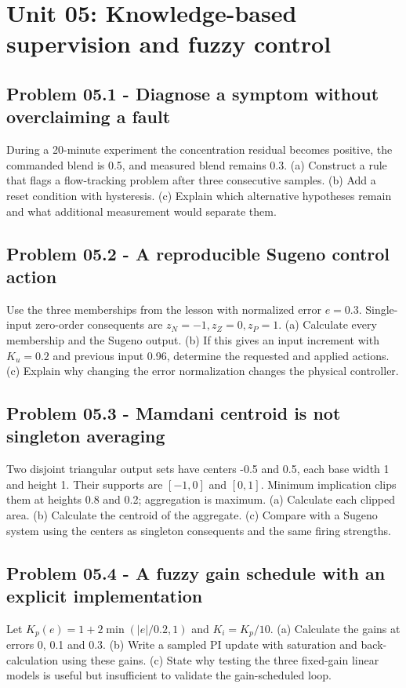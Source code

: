\documentclass[11pt,a4paper]{article}
\begin{document}
\clearpage\section{Unit 05: Knowledge-based supervision and fuzzy control}
\subsection{Problem 05.1 - Diagnose a symptom without overclaiming a fault}
During a 20-minute experiment the concentration residual becomes positive, the commanded blend is 0.5, and measured blend remains 0.3. (a) Construct a rule that flags a flow-tracking problem after three consecutive samples. (b) Add a reset condition with hysteresis. (c) Explain which alternative hypotheses remain and what additional measurement would separate them.

\subsection{Problem 05.2 - A reproducible Sugeno control action}
Use the three memberships from the lesson with normalized error $e=0.3$. Single-input zero-order consequents are $z_N=-1,z_Z=0,z_P=1$. (a) Calculate every membership and the Sugeno output. (b) If this gives an input increment with $K_u=0.2$ and previous input 0.96, determine the requested and applied actions. (c) Explain why changing the error normalization changes the physical controller.

\subsection{Problem 05.3 - Mamdani centroid is not singleton averaging}
Two disjoint triangular output sets have centers -0.5 and 0.5, each base width 1 and height 1. Their supports are $[-1,0]$ and $[0,1]$. Minimum implication clips them at heights 0.8 and 0.2; aggregation is maximum. (a) Calculate each clipped area. (b) Calculate the centroid of the aggregate. (c) Compare with a Sugeno system using the centers as singleton consequents and the same firing strengths.

\subsection{Problem 05.4 - A fuzzy gain schedule with an explicit implementation}
Let $K_p(e)=1+2\min(|e|/0.2,1)$ and $K_i=K_p/10$. (a) Calculate the gains at errors 0, 0.1 and 0.3. (b) Write a sampled PI update with saturation and back-calculation using these gains. (c) State why testing the three fixed-gain linear models is useful but insufficient to validate the gain-scheduled loop.
\end{document}
